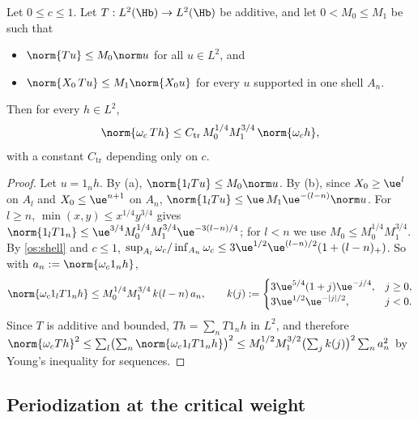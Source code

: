 \begin{lemma}\label{os:transfer}
Let $0\le c\le1$. Let $T:L^2(\Hb)\to L^2(\Hb)$ be additive, and let $0<M_0\le M_1$ be such that
\begin{itemize}
\item[(a)] $\norm{Tu}\le M_0\norm u$ for all $u\in L^2$, and
\item[(b)] $\norm{\osX\,Tu}\le M_1\norm{\osX u}$ for every $u$ supported in one shell $A_n$.
\end{itemize}
Then for every $h\in L^2$,
\[
\norm{\osomc\,Th}\le C_{\mathrm{tr}}\,M_0^{1/4}M_1^{3/4}\,\norm{\osomc h},
\]
with a constant $C_{\mathrm{tr}}$ depending only on $c$.
\end{lemma}
\begin{proof}
Let $u=1_nh$. By (a), $\norm{1_lTu}\le M_0\norm u$. By (b), since $\osX\ge\ue^l$ on $A_l$ and $\osX\le\ue^{n+1}$ on $A_n$,
$\norm{1_lTu}\le\ue\,M_1\ue^{-(l-n)}\norm u$. For $l\ge n$, $\min(x,y)\le x^{1/4}y^{3/4}$ gives
$\norm{1_lT1_n}\le\ue^{3/4}M_0^{1/4}M_1^{3/4}\ue^{-3(l-n)/4}$; for $l<n$ we use $M_0\le M_0^{1/4}M_1^{3/4}$. By \eqref{os:shell} and $c\le1$,
$\sup_{A_l}\osomc/\inf_{A_n}\osomc\le3\ue^{1/2}\ue^{(l-n)/2}(1+(l-n)_+)$. So with $a_n:=\norm{\osomc1_nh}$,
\[
\norm{\osomc1_lT1_nh}\le M_0^{1/4}M_1^{3/4}\,k(l-n)\,a_n,\qquad k(j):=\begin{cases}3\ue^{5/4}(1+j)\ue^{-j/4},&j\ge0,\\3\ue^{1/2}\ue^{-|j|/2},&j<0.\end{cases}
\]
Since $T$ is additive and bounded, $Th=\sum_nT1_nh$ in $L^2$, and therefore
$\norm{\osomc Th}^2\le\sum_l\bigl(\sum_n\norm{\osomc1_lT1_nh}\bigr)^2\le M_0^{1/2}M_1^{3/2}\bigl(\sum_jk(j)\bigr)^2\sum_na_n^2$ by Young's inequality for
sequences.
\end{proof}

\subsection{Periodization at the critical weight}

